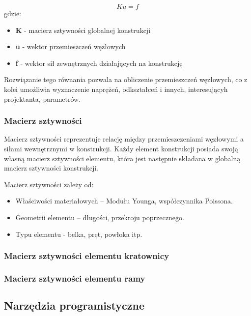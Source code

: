 \begin{equation}
    Ku = f
\end{equation}
gdzie:

\begin{itemize}
    \item \textbf{K} - macierz sztywności globalnej konstrukcji
    \item \textbf{u} - wektor przemieszczeń węzłowych
    \item \textbf{f} - wektor sił zewnętrznych działających na konstrukcję
\end{itemize}

Rozwiązanie tego równania pozwala na obliczenie przemieszczeń węzłowych, co z kolei umożliwia wyznaczenie naprężeń, odkształceń i innych, interesującyh projektanta, parametrów.

\subsubsection*{Macierz sztywności}

Macierz sztywności reprezentuje relację między przemieszczeniami węzłowymi a siłami wewnętrznymi w konstrukcji.
Każdy element konstrukcji posiada swoją własną macierz sztywności elementu, która jest następnie składana w globalną macierz sztywności konstrukcji.

Macierz sztywności zależy od:

\begin{itemize}
    \item Właściwości materiałowych – Modułu Younga, współczynnika Poissona.
    \item Geometrii elementu – długości, przekroju poprzecznego.
    \item Typu elementu - belka, pręt, powłoka itp.
\end{itemize}

\subsubsection*{Macierz sztywności elementu kratownicy}

\subsubsection*{Macierz sztywności elementu ramy}

\subsection{Narzędzia programistyczne}
